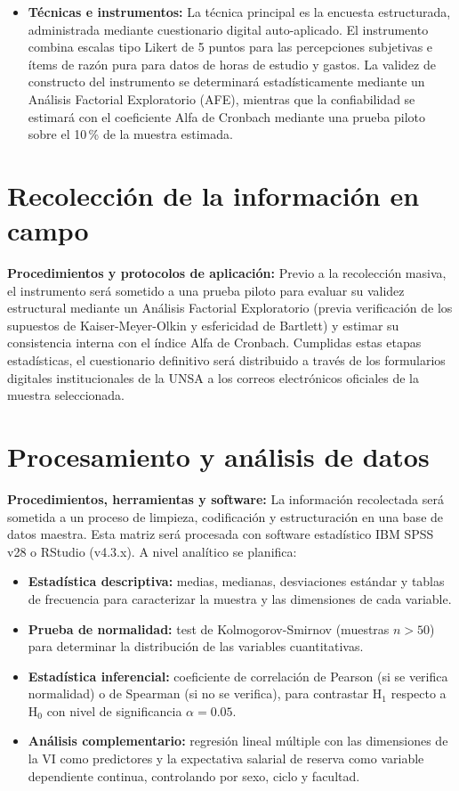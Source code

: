 \documentclass[11pt, a4paper]{article}
\begin{document}
\begin{itemize}
    \item \textbf{Técnicas e instrumentos:} La técnica principal es la encuesta estructurada, administrada mediante cuestionario digital auto-aplicado. El instrumento combina escalas tipo Likert de 5 puntos para las percepciones subjetivas e ítems de razón pura para datos de horas de estudio y gastos. La validez de constructo del instrumento se determinará estadísticamente mediante un Análisis Factorial Exploratorio (AFE), mientras que la confiabilidad se estimará con el coeficiente Alfa de Cronbach mediante una prueba piloto sobre el 10\,\% de la muestra estimada.
\end{itemize}

\section{Recolección de la información en campo}

\textbf{Procedimientos y protocolos de aplicación:} Previo a la recolección masiva, el instrumento será sometido a una prueba piloto para evaluar su validez estructural mediante un Análisis Factorial Exploratorio (previa verificación de los supuestos de Kaiser-Meyer-Olkin y esfericidad de Bartlett) y estimar su consistencia interna con el índice Alfa de Cronbach. Cumplidas estas etapas estadísticas, el cuestionario definitivo será distribuido a través de los formularios digitales institucionales de la UNSA a los correos electrónicos oficiales de la muestra seleccionada.

\section{Procesamiento y análisis de datos}

\textbf{Procedimientos, herramientas y software:} La información recolectada será sometida a un proceso de limpieza, codificación y estructuración en una base de datos maestra. Esta matriz será procesada con software estadístico IBM SPSS v28 o RStudio (v4.3.x). A nivel analítico se planifica:

\begin{itemize}
    \item \textbf{Estadística descriptiva:} medias, medianas, desviaciones estándar y tablas de frecuencia para caracterizar la muestra y las dimensiones de cada variable.
    \item \textbf{Prueba de normalidad:} test de Kolmogorov-Smirnov (muestras $n > 50$) para determinar la distribución de las variables cuantitativas.
    \item \textbf{Estadística inferencial:} coeficiente de correlación de Pearson (si se verifica normalidad) o de Spearman (si no se verifica), para contrastar H$_1$ respecto a H$_0$ con nivel de significancia $\alpha = 0.05$.
    \item \textbf{Análisis complementario:} regresión lineal múltiple con las dimensiones de la VI como predictores y la expectativa salarial de reserva como variable dependiente continua, controlando por sexo, ciclo y facultad.
\end{itemize}
\end{document}
